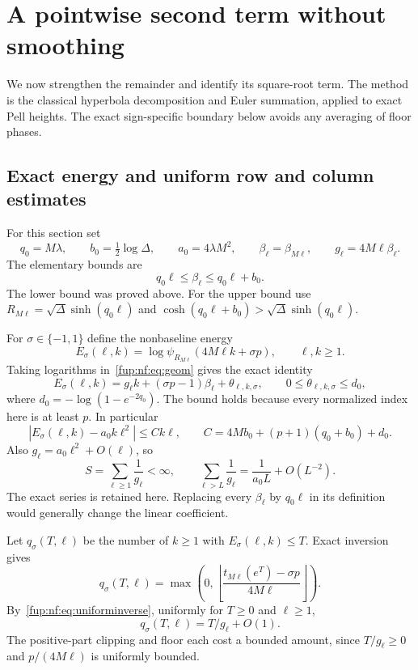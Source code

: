 \documentclass[11pt,letterpaper]{article}
\theoremstyle{definition}\newtheorem{definition}[theorem]{Definition}
\theoremstyle{remark}\newtheorem{remark}[theorem]{Remark}
\newcommand{\floor}[1]{\left\lfloor #1\right\rfloor}
\begin{document}
\section{A pointwise second term without smoothing}\label{fup:nf:sec:second}
We now strengthen the remainder and identify its square-root term. The method is the classical hyperbola decomposition and Euler summation, applied to exact Pell heights. The exact sign-specific boundary below avoids any averaging of floor phases.

\subsection{Exact energy and uniform row and column estimates}
For this section set
\[
 q_0=M\lambda,\qquad b_0=\tfrac12\log\Delta,\qquad
 a_0=4\lambda M^2,\qquad
 \beta_\ell=\beta_{M\ell},\qquad g_\ell=4M\ell\beta_\ell.
\]
The elementary bounds are
\begin{equation}\label{fup:nf:eq:betabounds}
 q_0\ell\le\beta_\ell\le q_0\ell+b_0.
\end{equation}
The lower bound was proved above. For the upper bound use
$R_{M\ell}=\sqrt\Delta\sinh(q_0\ell)$ and
$\cosh(q_0\ell+b_0)>\sqrt\Delta\sinh(q_0\ell)$.

For $\sigma\in\{-1,1\}$ define the nonbaseline energy
\[
 E_\sigma(\ell,k)=\log\psi_{R_{M\ell}}(4M\ell k+\sigma p),\qquad \ell,k\ge1.
\]
Taking logarithms in~\eqref{fup:nf:eq:geom} gives the exact identity
\begin{equation}\label{fup:nf:eq:energy}
 E_\sigma(\ell,k)=g_\ell k+(\sigma p-1)\beta_\ell+\theta_{\ell,k,\sigma},
 \qquad 0\le\theta_{\ell,k,\sigma}\le d_0,
\end{equation}
where $d_0=-\log(1-e^{-2q_0})$. The bound holds because every normalized index here is at least $p$. In particular
\begin{equation}\label{fup:nf:eq:quadratic}
 |E_\sigma(\ell,k)-a_0k\ell^2|\le Ck\ell,
 \qquad C=4Mb_0+(p+1)(q_0+b_0)+d_0.
\end{equation}
Also $g_\ell=a_0\ell^2+O(\ell)$, so
\begin{equation}\label{fup:nf:eq:slopetail}
 S=\sum_{\ell\ge1}\frac1{g_\ell}<\infty,
 \qquad\sum_{\ell>L}\frac1{g_\ell}
       =\frac1{a_0L}+O(L^{-2}).
\end{equation}
The exact series is retained here. Replacing every $\beta_\ell$ by $q_0\ell$ in its definition would generally change the linear coefficient.

Let $q_\sigma(T,\ell)$ be the number of $k\ge1$ with $E_\sigma(\ell,k)\le T$. Exact inversion gives
\[
 q_\sigma(T,\ell)=\max\left(0,
 \floor{\frac{t_{M\ell}(e^T)-\sigma p}{4M\ell}}\right).
\]
By~\eqref{fup:nf:eq:uniforminverse}, uniformly for $T\ge0$ and $\ell\ge1$,
\begin{equation}\label{fup:nf:eq:row}
 q_\sigma(T,\ell)=T/g_\ell+O(1).
\end{equation}
The positive-part clipping and floor each cost a bounded amount, since $T/g_\ell\ge0$ and $p/(4M\ell)$ is uniformly bounded.
\end{document}
